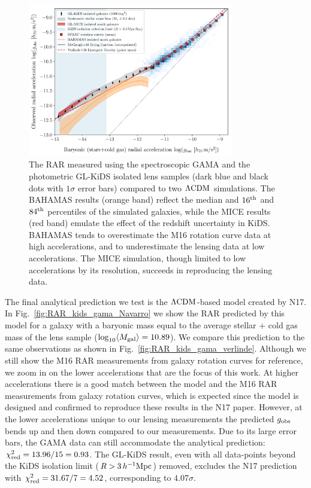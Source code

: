 \documentclass[usenatbib]{mnras}
\newcommand{\hMpc}{\, h^{-1}{\rm{Mpc}} }
\newcommand{\lcdm}{{\rm \Lambda CDM}}
\newcommand*{\meanb}[1]{\langle{#1}\rangle}
\newcommand{\un}[1]{_{\rm #1}}
\begin{document}
\begin{figure}
	\includegraphics[width=0.8\textwidth]{Figures/RAR_KiDS+MICE+Bahamas+Verlinde_No_Nobins_isolated_zoomout.pdf}
	\caption{The RAR measured using the spectroscopic GAMA and the photometric GL-KiDS isolated lens samples (dark blue and black dots with $1\sigma$ error bars) compared to two $\lcdm$ simulations. The BAHAMAS results (orange band) reflect the median and $16^{\rm th}$ and $84^{\rm th}$ percentiles of the simulated galaxies, while the MICE results (red band) emulate the effect of the redshift uncertainty in KiDS. BAHAMAS tends to overestimate the M16 rotation curve data at high accelerations, and to underestimate the lensing data at low accelerations. The MICE simulation, though limited to low accelerations by its resolution, succeeds in reproducing the lensing data.}
	\label{fig:RAR_kids_mice_bahamas}
\end{figure}

The final analytical prediction we test is the $\lcdm$-based model created by N17. In Fig.~\ref{fig:RAR_kids_gama_Navarro} we show the RAR predicted by this model for a galaxy with a baryonic mass equal to the average stellar + cold gas mass of the lens sample ($\log_{10}\meanb{M\un{gal}} = 10.89$). We compare this prediction to the same observations as shown in Fig.~\ref{fig:RAR_kids_gama_verlinde}. Although we still show the M16 RAR measurements from galaxy rotation curves for reference, we zoom in on the lower accelerations that are the focus of this work. At higher accelerations there is a good match between the model and the M16 RAR measurements from galaxy rotation curves, which is expected since the model is designed and confirmed to reproduce these results in the N17 paper. However, at the lower accelerations unique to our lensing measurements the predicted $g\un{obs}$ bends up and then down compared to our measurements. Due to its large error bars, the GAMA data can still accommodate the analytical prediction: $\chi\un{red}^2 = 13.96 / 15 = 0.93$. The GL-KiDS result, even with all data-points beyond the KiDS isolation limit ($R>3 \hMpc$) removed, excludes the N17 prediction with $\chi\un{red}^2 = 31.67 / 7 = 4.52$, corresponding to $4.07 \sigma$.
\end{document}
